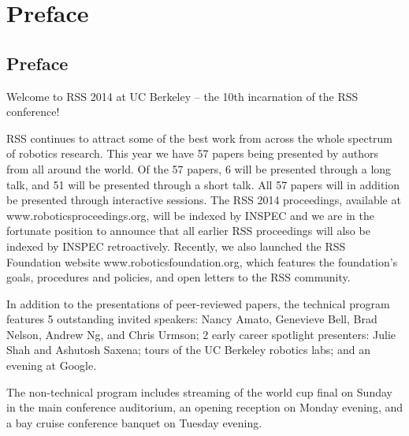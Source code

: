 
\chapter*{Preface}


                                                                     
                                             
\vspace{3cm}
\section*{Preface}
\begingroup{}
\Large
\vspace{1cm}

Welcome to RSS 2014 at UC Berkeley – the 10th incarnation of the RSS conference!

\vspace{1mm}

RSS continues to attract some of the best work from across the whole spectrum of robotics research. This year we have 57 papers being presented by authors from all around the world. Of the 57 papers, 6 will be presented through a long talk, and 51 will be presented through a short talk. All 57 papers will in addition be presented through interactive sessions. The RSS 2014 proceedings, available at www.roboticsproceedings.org, will be indexed by INSPEC and we are in the fortunate position to announce that all earlier RSS proceedings will also be indexed by INSPEC retroactively. Recently, we also launched the RSS Foundation website www.roboticsfoundation.org, which features the foundation's goals, procedures and policies, and open letters to the RSS community.

\vspace{1mm}

In addition to the presentations of peer-reviewed papers, the technical program features 5 outstanding invited speakers: Nancy Amato, Genevieve Bell, Brad Nelson, Andrew Ng, and Chris Urmson; 2 early career spotlight presenters: Julie Shah and Ashutosh Saxena; tours of the UC Berkeley robotics labs; and an evening at Google.

\vspace{1mm}

The non-technical program includes streaming of the world cup final on Sunday in the main conference auditorium, an opening reception on Monday evening, and a bay cruise conference banquet on Tuesday evening.

